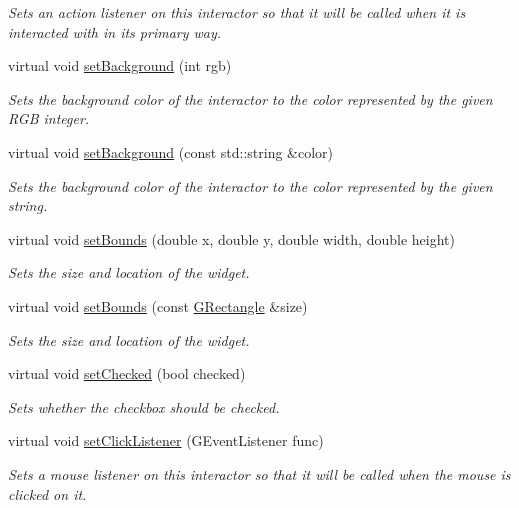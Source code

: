 \begin{DoxyCompactItemize}
\begin{DoxyCompactList}\small\item\em Sets an action listener on this interactor so that it will be called when it is interacted with in its primary way. \end{DoxyCompactList}\item 
virtual void \mbox{\hyperlink{classGInteractor_acba7e546c2025c0a15ca4b4cc92043db}{set\+Background}} (int rgb)
\begin{DoxyCompactList}\small\item\em Sets the background color of the interactor to the color represented by the given R\+GB integer. \end{DoxyCompactList}\item 
virtual void \mbox{\hyperlink{classGInteractor_ab4677ab2474e68b07aa56605af92a84a}{set\+Background}} (const std\+::string \&color)
\begin{DoxyCompactList}\small\item\em Sets the background color of the interactor to the color represented by the given string. \end{DoxyCompactList}\item 
virtual void \mbox{\hyperlink{classGInteractor_a2aae8197624b72265ab83b4f1bc73f2f}{set\+Bounds}} (double x, double y, double width, double height)
\begin{DoxyCompactList}\small\item\em Sets the size and location of the widget. \end{DoxyCompactList}\item 
virtual void \mbox{\hyperlink{classGInteractor_acada386653f008cacc7cce86426bef7c}{set\+Bounds}} (const \mbox{\hyperlink{structGRectangle}{G\+Rectangle}} \&size)
\begin{DoxyCompactList}\small\item\em Sets the size and location of the widget. \end{DoxyCompactList}\item 
virtual void \mbox{\hyperlink{classGCheckBox_a116285e2f56247b00b26035ca0ac4737}{set\+Checked}} (bool checked)
\begin{DoxyCompactList}\small\item\em Sets whether the checkbox should be checked. \end{DoxyCompactList}\item 
virtual void \mbox{\hyperlink{classGInteractor_abd40af6921242584d0954f173911b190}{set\+Click\+Listener}} (G\+Event\+Listener func)
\begin{DoxyCompactList}\small\item\em Sets a mouse listener on this interactor so that it will be called when the mouse is clicked on it. \end{DoxyCompactList}\item 

\end{DoxyCompactItemize}
